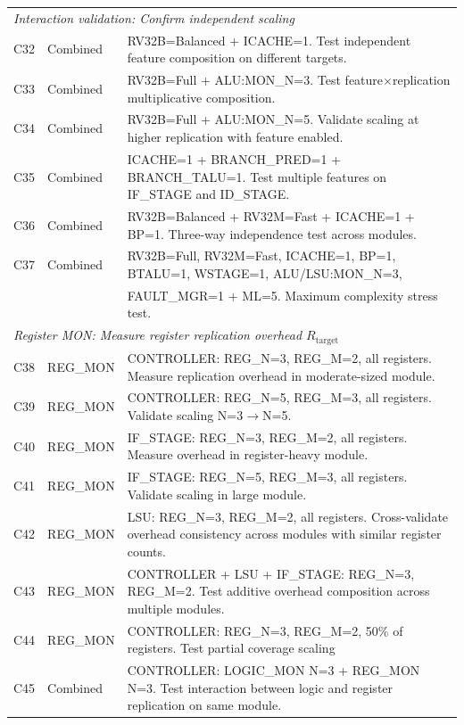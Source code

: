 \begin{table}[htbp]
\begin{tabularx}{\linewidth}{@{}llX@{}}
\midrule
\multicolumn{3}{l}{\textit{Interaction validation: Confirm independent scaling}} \\
C32 & Combined & RV32B=Balanced + ICACHE=1. Test independent feature composition on different targets. \\
C33 & Combined & RV32B=Full + ALU:MON\_N=3. Test feature$\times$replication multiplicative composition. \\
C34 & Combined & RV32B=Full + ALU:MON\_N=5. Validate scaling at higher replication with feature enabled. \\
C35 & Combined & ICACHE=1 + BRANCH\_PRED=1 + BRANCH\_TALU=1. Test multiple features on IF\_STAGE and ID\_STAGE. \\
C36 & Combined & RV32B=Balanced + RV32M=Fast + ICACHE=1 + BP=1. Three-way independence test across modules. \\
C37 & Combined & RV32B=Full, RV32M=Fast, ICACHE=1, BP=1, BTALU=1, WSTAGE=1, ALU/LSU:MON\_N=3, \\
 & & FAULT\_MGR=1 + ML=5. Maximum complexity stress test. \\
\midrule
\multicolumn{3}{l}{\textit{Register MON: Measure register replication overhead $R_{\text{target}}$}} \\
C38 & REG\_MON & CONTROLLER: REG\_N=3, REG\_M=2, all registers. Measure replication overhead in moderate-sized module. \\
C39 & REG\_MON & CONTROLLER: REG\_N=5, REG\_M=3, all registers. Validate scaling N=3$\to$N=5. \\
C40 & REG\_MON & IF\_STAGE: REG\_N=3, REG\_M=2, all registers. Measure overhead in register-heavy module. \\
C41 & REG\_MON & IF\_STAGE: REG\_N=5, REG\_M=3, all registers. Validate scaling in large module. \\
C42 & REG\_MON & LSU: REG\_N=3, REG\_M=2, all registers. Cross-validate overhead consistency across modules with similar register counts. \\
C43 & REG\_MON & CONTROLLER + LSU + IF\_STAGE: REG\_N=3, REG\_M=2. Test additive overhead composition across multiple modules. \\
C44 & REG\_MON & CONTROLLER: REG\_N=3, REG\_M=2, 50\% of registers. Test partial coverage scaling \\
C45 & Combined & CONTROLLER: LOGIC\_MON N=3 + REG\_MON N=3. Test interaction between logic and register replication on same module. \\
\bottomrule
\end{tabularx}
\end{table}


